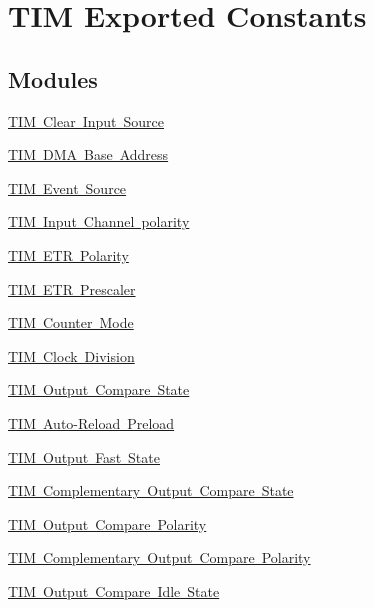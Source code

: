 \hypertarget{group___t_i_m___exported___constants}{}\section{T\+IM Exported Constants}
\label{group___t_i_m___exported___constants}
\subsection*{Modules}
\begin{DoxyCompactItemize}
\item 
\mbox{\hyperlink{group___t_i_m___clear_input___source}{T\+I\+M Clear Input Source}}
\item 
\mbox{\hyperlink{group___t_i_m___d_m_a___base__address}{T\+I\+M D\+M\+A Base Address}}
\item 
\mbox{\hyperlink{group___t_i_m___event___source}{T\+I\+M Event Source}}
\item 
\mbox{\hyperlink{group___t_i_m___input___channel___polarity}{T\+I\+M Input Channel polarity}}
\item 
\mbox{\hyperlink{group___t_i_m___e_t_r___polarity}{T\+I\+M E\+T\+R Polarity}}
\item 
\mbox{\hyperlink{group___t_i_m___e_t_r___prescaler}{T\+I\+M E\+T\+R Prescaler}}
\item 
\mbox{\hyperlink{group___t_i_m___counter___mode}{T\+I\+M Counter Mode}}
\item 
\mbox{\hyperlink{group___t_i_m___clock_division}{T\+I\+M Clock Division}}
\item 
\mbox{\hyperlink{group___t_i_m___output___compare___state}{T\+I\+M Output Compare State}}
\item 
\mbox{\hyperlink{group___t_i_m___auto_reload_preload}{T\+I\+M Auto-\/\+Reload Preload}}
\item 
\mbox{\hyperlink{group___t_i_m___output___fast___state}{T\+I\+M Output Fast State}}
\item 
\mbox{\hyperlink{group___t_i_m___output___compare___n___state}{T\+I\+M Complementary Output Compare State}}
\item 
\mbox{\hyperlink{group___t_i_m___output___compare___polarity}{T\+I\+M Output Compare Polarity}}
\item 
\mbox{\hyperlink{group___t_i_m___output___compare___n___polarity}{T\+I\+M Complementary Output Compare Polarity}}
\item 
\mbox{\hyperlink{group___t_i_m___output___compare___idle___state}{T\+I\+M Output Compare Idle State}}

\end{DoxyCompactItemize}
